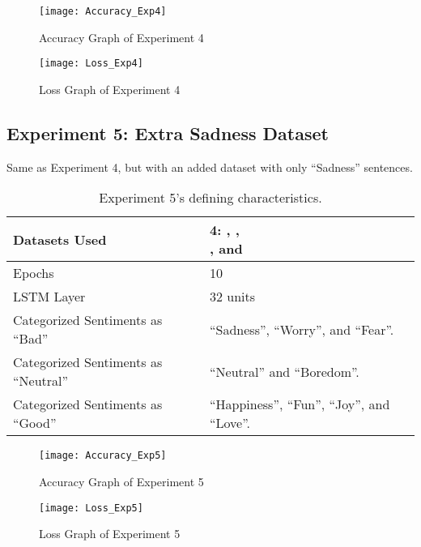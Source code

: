 \begin{figure}[!h]
	\centering
	\texttt{[image: Accuracy\_Exp4]}
	\caption{Accuracy Graph of Experiment 4}
	\label{fig:accuracy_exp4}
	\texttt{[image: Loss\_Exp4]}
	\caption{Loss Graph of Experiment 4}
	\label{fig:loss_exp4}
\end{figure}
\pagebreak

\subsection{Experiment 5: Extra Sadness Dataset}
\label{exp5}
Same as Experiment 4, but with an added dataset with only ``Sadness'' sentences.
\begin{table}[!h]
	\caption{Experiment 5's defining characteristics.}
	\vspace{0.5cm}
	\centering
	\begin{tabular}[t]{|l|l|}
	\hline
		Datasets Used & \makecell{4: \citet{d1}, \citet{d2},\\ \citet{d3}, and \citet{d4}}
	\\ \hline
		Epochs & 10
	\\ \hline
		LSTM Layer & 32 units
	\\ \hline
		Categorized Sentiments as ``Bad'' & ``Sadness'', ``Worry'', and ``Fear''.
	\\ \hline	
		 Categorized Sentiments as ``Neutral'' & ``Neutral'' and ``Boredom''.
	\\ \hline	
		Categorized Sentiments as ``Good'' & ``Happiness'', ``Fun'', ``Joy'', and ``Love''.
	\\ \hline
	\end{tabular}
\end{table}

\begin{figure}[!h]
	\centering
	\texttt{[image: Accuracy\_Exp5]}
	\caption{Accuracy Graph of Experiment 5}
	\label{fig:accuracy_exp5}
	\texttt{[image: Loss\_Exp5]}
	\caption{Loss Graph of Experiment 5}
	\label{fig:loss_exp5}
\end{figure}
\pagebreak

